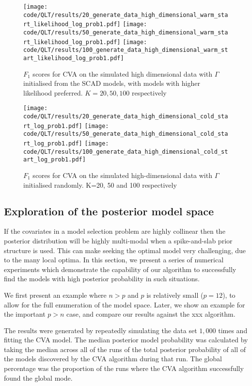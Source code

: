 \documentclass{amsart}[12pt]
\begin{document}
\begin{figure}\label{fig:highdim_warm_start_likelihood}
\caption{$F_1$ scores for CVA on the simulated high dimensional data with $\Gamma$ initialised from the SCAD models, with models with higher likelihood preferred. $K=20, 50, 100$ respectively}
\texttt{[image: code/QLT/results/20\_generate\_data\_high\_dimensional\_warm\_start\_likelihood\_log\_prob1.pdf]}
\texttt{[image: code/QLT/results/50\_generate\_data\_high\_dimensional\_warm\_start\_likelihood\_log\_prob1.pdf]}
\texttt{[image: code/QLT/results/100\_generate\_data\_high\_dimensional\_warm\_start\_likelihood\_log\_prob1.pdf]}
\end{figure}

\begin{figure}\label{fig:highdim_cold_start}
\caption{$F_1$ scores for CVA on the simulated high-dimensional data with $\Gamma$ initialised randomly.
					K=20, 50 and 100 respectively}
\texttt{[image: code/QLT/results/20\_generate\_data\_high\_dimensional\_cold\_start\_log\_prob1.pdf]}
\texttt{[image: code/QLT/results/50\_generate\_data\_high\_dimensional\_cold\_start\_log\_prob1.pdf]}
\texttt{[image: code/QLT/results/100\_generate\_data\_high\_dimensional\_cold\_start\_log\_prob1.pdf]}
\end{figure}

\subsection{Exploration of the posterior model space}

If the covariates in a model selection problem are highly collinear then the posterior distribution will be
highly multi-modal when a spike-and-slab prior structure is used. This can make seeking the optimal model very
challenging, due to the many local optima. In this section, we present a series of numerical experiments which
demonstrate the capability of our algorithm to successfully find the models with high posterior probability in
such situations.

We first present an example where $n > p$ and $p$ is relatively small ($p = 12$), to allow for the full 
enumeration of the model space. Later, we show an example for the important $p > n$ case, and compare our results 
against the xxx algorithm.

The results were generated by repeatedly simulating the data set $1,000$ times and fitting the CVA model.
The median posterior model probability was calculated by taking the median across all of the runs of the
total posterior probability of all of the models discovered by the CVA algorithm during that run. The global
percentage was the proportion of the runs where the CVA algorithm successfully found the global mode.
\end{document}
